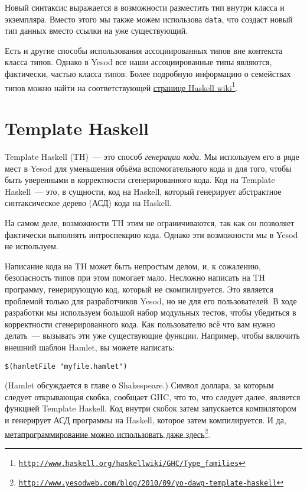 Новый синтаксис выражается в возможности разместить тип внутри класса и экземпляра. Вместо этого мы также можем использова \lstinline'data', что создаст новый тип данных вместо ссылки на уже существующий.

\begin{remark}
Есть и другие способы использования ассоциированных типов вне контекста класса типов. Однако в Yesod все наши ассоциированные типы являются, фактически, частью класса типов. Более подробную информацию о семействах типов можно найти на соответствующей \href{http://www.haskell.org/haskellwiki/GHC/Type\_families}{странице Haskell wiki}\footnote{\href{http://www.haskell.org/haskellwiki/GHC/Type\_families}{\texttt{http://www.haskell.org/haskellwiki/GHC/Type\_families}}}.
\end{remark}

\section{Template Haskell}

Template Haskell (TH)~--- это способ \emph{генерации кода}. Мы используем его в ряде мест в Yesod для уменьшения объёма вспомогательного кода и для того, чтобы быть уверенными в корректности сгенерированного кода. Код на Template Haskell~--- это, в сущности, код на Haskell, который генерирует абстрактное синтаксическое дерево (АСД) кода на Haskell.

\begin{remark}
На самом деле, возможности TH этим не ограничиваются, так как он позволяет фактически выполнять интроспекцию кода. Однако эти возможности мы в Yesod не используем.
\end{remark}

Написание кода на TH может быть непростым делом, и, к сожалению, безопасность типов при этом помогает мало. Несложно написать на TH программу, генерирующую код, который не скомпилируется. Это является проблемой только для разработчиков Yesod, но не для его пользователей. В ходе разработки мы используем большой набор модульных тестов, чтобы убедиться в корректности сгенерированного кода. Как пользователю всё что вам нужно делать~--- вызывать эти уже существующие функции. Например, чтобы включить внешний шаблон Hamlet, вы можете написать:

\begin{lstlisting}
$(hamletFile "myfile.hamlet")
\end{lstlisting}

(Hamlet обсуждается в главе о Shakespeare.) Символ доллара, за которым следует открывающая скобка, сообщает GHC, что то, что следует далее, является функцией Template Haskell. Код внутри скобок затем запускается компилятором и генерирует АСД программы на Haskell, которое затем компилируется. И да, \href{http://www.yesodweb.com/blog/2010/09/yo-dawg-template-haskell}{метапрограммирование можно использовать даже здесь}\footnote{\href{http://www.yesodweb.com/blog/2010/09/yo-dawg-template-haskell}{\texttt{http://www.yesodweb.com/blog/2010/09/yo-dawg-template-haskell}}}.

